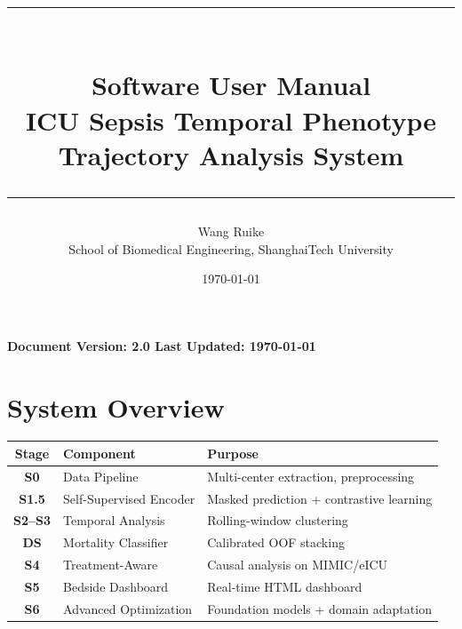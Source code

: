 \documentclass[11pt,a4paper]{article}
\title{%
    \vspace{-1cm}
    {\color{primary}\rule{\linewidth}{2pt}}\\[0.4cm]
    {\Huge\bfseries\color{primary} Software User Manual}\\[0.3cm]
    {\Large\color{secondary} ICU Sepsis Temporal Phenotype}\\[-0.1cm]
    {\Large\color{secondary} Trajectory Analysis System}\\[0.3cm]
    {\color{primary}\rule{\linewidth}{2pt}}
}
\author{%
    \large Wang Ruike\\[0.2cm]
    \normalsize School of Biomedical Engineering, ShanghaiTech University
}
\date{\today}
\renewcommand{\arraystretch}{1.3}
\begin{document}
\maketitle
\thispagestyle{empty}

\vspace{1cm}
\begin{center}
\begin{tcolorbox}[
    enhanced,
    colback=lightgray,
    colframe=primary,
    width=0.9\textwidth,
    arc=3mm,
    boxrule=1pt,
]
\centering
\large\bfseries Document Version: 2.0 \hspace{2em} Last Updated: \today
\end{tcolorbox}
\end{center}

\newpage
\tableofcontents
\newpage

\section{System Overview}

\begin{tcolorbox}[
    enhanced,
    colback=white,
    colframe=primary,
    title={\large\bfseries\faHospital\hspace{0.5em}Software Components},
    fonttitle=\color{white},
    attach boxed title to top center={yshift=-3mm},
    boxed title style={colback=primary,sharp corners},
    arc=2mm,
    boxrule=1pt,
]
\begin{center}
\renewcommand{\arraystretch}{1.4}
\begin{tabular}{cll}
\toprule
\textbf{Stage} & \textbf{Component} & \textbf{Purpose} \\
\midrule
\rowcolor{primary!10} \textbf{S0} & Data Pipeline & Multi-center extraction, preprocessing \\
\textbf{S1.5} & Self-Supervised Encoder & Masked prediction + contrastive learning \\
\rowcolor{primary!10} \textbf{S2--S3} & Temporal Analysis & Rolling-window clustering \\
\textbf{DS} & Mortality Classifier & Calibrated OOF stacking \\
\rowcolor{primary!10} \textbf{S4} & Treatment-Aware & Causal analysis on MIMIC/eICU \\
\textbf{S5} & Bedside Dashboard & Real-time HTML dashboard \\
\rowcolor{primary!10} \textbf{S6} & Advanced Optimization & Foundation models + domain adaptation \\
\bottomrule
\end{tabular}
\end{center}
\end{tcolorbox}
\end{document}
